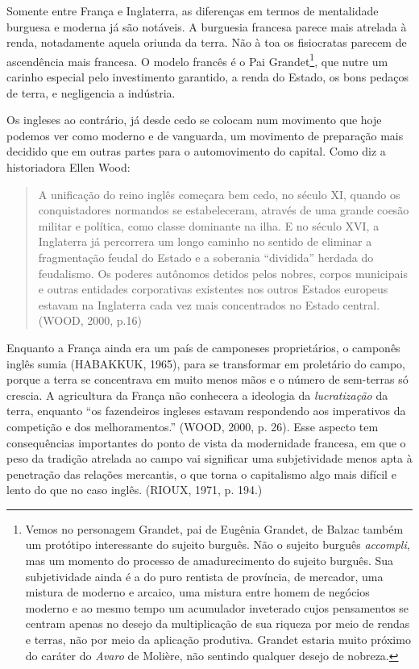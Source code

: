 Somente entre França e Inglaterra, as diferenças em termos de
mentalidade burguesa e moderna já são notáveis. A burguesia francesa
parece mais atrelada à renda, notadamente aquela oriunda da terra. Não à
toa os fisiocratas parecem de ascendência mais francesa. O modelo
francês é o Pai Grandet\footnote{Vemos no personagem Grandet, pai de
  Eugênia Grandet, de Balzac também um protótipo interessante do sujeito
  burguês. Não o sujeito burguês \emph{accompli}, mas um momento do
  processo de amadurecimento do sujeito burguês. Sua subjetividade ainda
  é a do puro rentista de província, de mercador, uma mistura de moderno
  e arcaico, uma mistura entre homem de negócios moderno e ao mesmo
  tempo um acumulador inveterado cujos pensamentos se centram apenas no
  desejo da multiplicação de sua riqueza por meio de rendas e terras,
  não por meio da aplicação produtiva. Grandet estaria muito próximo do
  caráter do \emph{Avaro} de Molière, não sentindo qualquer desejo de
  nobreza.}, que nutre um carinho especial pelo investimento garantido,
a renda do Estado, os bons pedaços de terra, e negligencia a indústria.

Os ingleses ao contrário, já desde cedo se colocam num movimento que
hoje podemos ver como moderno e de vanguarda, um movimento de preparação
mais decidido que em outras partes para o automovimento do capital. Como
diz a historiadora Ellen Wood:

\begin{quote}
A unificação do reino inglês começara bem cedo, no século XI, quando os
conquistadores normandos se estabeleceram, através de uma grande coesão
militar e política, como classe dominante na ilha. E no século XVI, a
Inglaterra já percorrera um longo caminho no sentido de eliminar a
fragmentação feudal do Estado e a soberania ``dividida'' herdada do
feudalismo. Os poderes autônomos detidos pelos nobres, corpos municipais
e outras entidades corporativas existentes nos outros Estados europeus
estavam na Inglaterra cada vez mais concentrados no Estado central.
(WOOD, 2000, p.16)
\end{quote}

Enquanto a França ainda era um país de camponeses proprietários, o
camponês inglês sumia (HABAKKUK, 1965), para se transformar em
proletário do campo, porque a terra se concentrava em muito menos mãos e
o número de sem-terras só crescia. A agricultura da França não conhecera
a ideologia da \emph{lucratização} da terra, enquanto ``os fazendeiros
ingleses estavam respondendo aos imperativos da competição e dos
melhoramentos.'' (WOOD, 2000, p. 26). Esse aspecto tem consequências
importantes do ponto de vista da modernidade francesa, em que o peso da
tradição atrelada ao campo vai significar uma subjetividade menos apta à
penetração das relações mercantis, o que torna o capitalismo algo mais
difícil e lento do que no caso inglês. (RIOUX, 1971, p. 194.)

